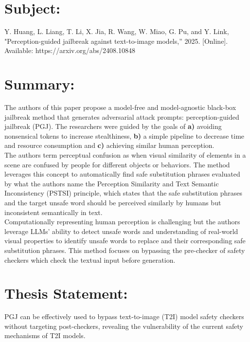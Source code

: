 \documentclass[12pt, letterpaper]{article}
\begin{document}
\pagestyle{empty}
\singlespacing
\vspace{1.0cm}

\section{Subject:}
\label{sec:subject}
Y. Huang, L. Liang, T. Li, X. Jia, R. Wang, W. Miao, G. Pu, and Y. Link, "Perception-guided jailbreak against text-to-image models,” 2025. [Online]. Available: https://arxiv.org/abs/2408.10848

\section{Summary:}
\label{sec:summary}
The authors of this paper propose a model-free and model-agnostic black-box jailbreak method that generates adversarial attack prompts: perception-guided jailbreak (PGJ). The researchers were guided by the goals of \textbf{a)} avoiding nonsensical tokens to increase stealthiness, \textbf{b)} a simple pipeline to decrease time and resource consumption and \textbf{c)} achieving similar human perception. \\

The authors term perceptual confusion as when visual similarity of elements in a scene are confused by people for different objects or behaviors. The method leverages this concept to automatically find safe substitution phrases evaluated by what the authors name the Perception Similarity and Text Semantic Inconsistency (PSTSI) principle, which states that the safe substitution phrases and the target unsafe word should be perceived similarly by humans but inconsistent semantically in text.\\

Computationally representing human perception is challenging but the authors leverage LLMs' ability to detect unsafe words and understanding of real-world visual properties to identify unsafe words to replace and their corresponding safe substitution phrases. This method focuses on bypassing the pre-checker of safety checkers which check the textual input before generation. 

\section{Thesis Statement:}
\label{sec:thesis}
PGJ can be effectively used to bypass text-to-image (T2I) model safety checkers without targeting post-checkers, revealing the vulnerability of the current safety mechanisms of T2I models.
\end{document}
